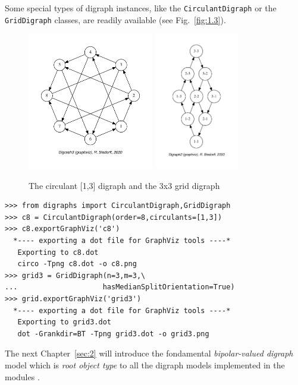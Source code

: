 Some special types of digraph instances, like the \texttt{CirculantDigraph} or the \texttt{GridDigraph} classes, are readily available (see Fig.~\vref{fig:1.3}).
 \begin{figure}[ht]
  \includegraphics[height=6cm]{Figures/1-3-c8.pdf} \hfill
  \includegraphics[height=6cm]{Figures/1-3-grid3.pdf} \hfill
  \caption{The circulant [1,3] digraph and the 3x3 grid digraph}
\label{fig:1.3}       %
\end{figure}
\begin{lstlisting}[caption={Circulant digraphs and $n \times m$ grid digraphs},label=list:1.7]
>>> from digraphs import CirculantDigraph,GridDigraph
>>> c8 = CirculantDigraph(order=8,circulants=[1,3])
>>> c8.exportGraphViz('c8')
  *---- exporting a dot file for GraphViz tools ----*
   Exporting to c8.dot
   circo -Tpng c8.dot -o c8.png
>>> grid3 = GridDigraph(n=3,m=3,\
...                    hasMedianSplitOrientation=True)
>>> grid.exportGraphViz('grid3')
  *---- exporting a dot file for GraphViz tools ----*
   Exporting to grid3.dot
   dot -Grankdir=BT -Tpng grid3.dot -o grid3.png
 \end{lstlisting}

\vspace{\baselineskip}
The next Chapter~\ref{sec:2} will introduce the fondamental \emph{bipolar-valued digraph} model which is \emph{root object type} to all the digraph models implemented in the \Digraph modules \citep{BIS-2021b}.    

{}
{}

%
%
